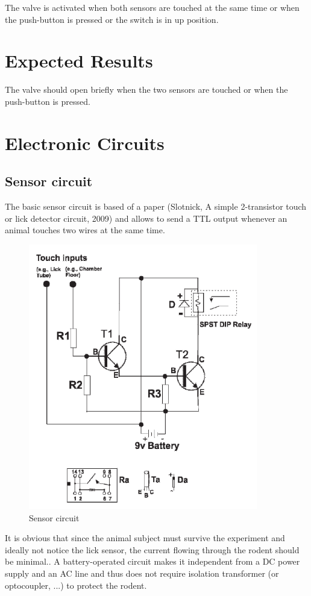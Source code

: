 \documentclass[a4paper]{article}
\begin{document}
The valve is activated when both sensors are touched at the same time or when the push-button is pressed or the switch is in up position.

\section{Expected Results}
The valve should open briefly when the two sensors are touched or when the push-button is pressed.
\section{Electronic Circuits}
\subsection{Sensor circuit}
The basic sensor circuit is based of a paper (Slotnick, A simple 2-transistor touch or lick detector circuit, 2009) and allows to send a TTL output whenever an animal touches two wires at the same time.

\begin{figure}[h!]
    \centering
    \includegraphics[width = 10cm]{images/sensor.png}
    \caption{Sensor circuit}
    \label{fig:sensor}
\end{figure}

It is obvious that since the animal subject must survive the experiment and ideally not notice the lick sensor, the current flowing through the rodent should be minimal..
A battery-operated circuit makes it independent from a DC power supply and an AC line and thus does not require isolation transformer (or optocoupler, ...) to protect the rodent.
\end{document}
